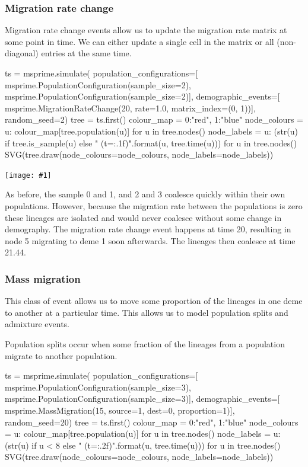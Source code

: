 \documentclass[graybox]{svmult}
\newcommand{\includenbimage}[1]{\begin{center}\texttt{[image: \#1]}\end{center}}
\begin{document}
\subsubsection{Migration rate change}\label{migration-rate-change}

Migration rate change events allow us to update the migration rate
matrix at some point in time. We can either update a single cell in the
matrix or all (non-diagonal) entries at the same time.
\begin{pythoncode}
ts  = msprime.simulate(
    population_configurations=[
        msprime.PopulationConfiguration(sample_size=2),
        msprime.PopulationConfiguration(sample_size=2)],
    demographic_events=[
        msprime.MigrationRateChange(20, rate=1.0, matrix_index=(0, 1))],
    random_seed=2)
tree = ts.first()
colour_map = {0:"red", 1:"blue"}
node_colours = {u: colour_map[tree.population(u)] for u in tree.nodes()}
node_labels = {
    u: (str(u) if tree.is_sample(u) else "{} (t={:.1f})".format(u,
tree.time(u)))
    for u in tree.nodes()}
SVG(tree.draw(node_colours=node_colours, node_labels=node_labels))
\end{pythoncode}

\includenbimage{images/simulations_34_0.pdf}

    As before, the sample 0 and 1, and 2 and 3 coalesce quickly within their
own populations. However, because the migration rate between the
populations is zero these lineages are isolated and would never coalesce
without some change in demography. The migration rate change event
happens at time 20, resulting in node 5 migrating to deme 1 soon
afterwards. The lineages then coalesce at time 21.44.

\subsubsection{Mass migration}\label{mass-migration}

This class of event allows us to move some proportion of the lineages in
one deme to another at a particular time. This allows us to model
population splits and admixture events.

Population splits occur when some fraction of the lineages from a
population migrate to another population.

\begin{pythoncode}
ts  = msprime.simulate(
    population_configurations=[
        msprime.PopulationConfiguration(sample_size=3),
        msprime.PopulationConfiguration(sample_size=3)],
    demographic_events=[
        msprime.MassMigration(15, source=1, dest=0, proportion=1)],
    random_seed=20)
tree = ts.first()
colour_map = {0:"red", 1:"blue"}
node_colours = {u: colour_map[tree.population(u)] for u in tree.nodes()}
node_labels = {
    u: (str(u) if u < 8 else "{} (t={:.2f})".format(u, tree.time(u)))
    for u in tree.nodes()}
SVG(tree.draw(node_colours=node_colours, node_labels=node_labels))
\end{pythoncode}
\end{document}
